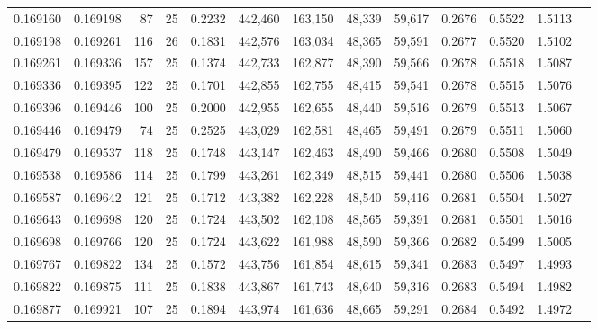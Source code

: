 \begin{tabular}{rrrrrrrrrrrrr}
0.169160 & 0.169198 &    87 &  25 &                                     0.2232 & 442,460 & 163,150 &  48,339 &  59,617 & 0.2676 & 0.5522 & 1.5113 \\
0.169198 & 0.169261 &   116 &  26 &                                     0.1831 & 442,576 & 163,034 &  48,365 &  59,591 & 0.2677 & 0.5520 & 1.5102 \\
0.169261 & 0.169336 &   157 &  25 &                                     0.1374 & 442,733 & 162,877 &  48,390 &  59,566 & 0.2678 & 0.5518 & 1.5087 \\
0.169336 & 0.169395 &   122 &  25 &                                     0.1701 & 442,855 & 162,755 &  48,415 &  59,541 & 0.2678 & 0.5515 & 1.5076 \\
0.169396 & 0.169446 &   100 &  25 &                                     0.2000 & 442,955 & 162,655 &  48,440 &  59,516 & 0.2679 & 0.5513 & 1.5067 \\
0.169446 & 0.169479 &    74 &  25 &                                     0.2525 & 443,029 & 162,581 &  48,465 &  59,491 & 0.2679 & 0.5511 & 1.5060 \\
0.169479 & 0.169537 &   118 &  25 &                                     0.1748 & 443,147 & 162,463 &  48,490 &  59,466 & 0.2680 & 0.5508 & 1.5049 \\
0.169538 & 0.169586 &   114 &  25 &                                     0.1799 & 443,261 & 162,349 &  48,515 &  59,441 & 0.2680 & 0.5506 & 1.5038 \\
0.169587 & 0.169642 &   121 &  25 &                                     0.1712 & 443,382 & 162,228 &  48,540 &  59,416 & 0.2681 & 0.5504 & 1.5027 \\
0.169643 & 0.169698 &   120 &  25 &                                     0.1724 & 443,502 & 162,108 &  48,565 &  59,391 & 0.2681 & 0.5501 & 1.5016 \\
0.169698 & 0.169766 &   120 &  25 &                                     0.1724 & 443,622 & 161,988 &  48,590 &  59,366 & 0.2682 & 0.5499 & 1.5005 \\
0.169767 & 0.169822 &   134 &  25 &                                     0.1572 & 443,756 & 161,854 &  48,615 &  59,341 & 0.2683 & 0.5497 & 1.4993 \\
0.169822 & 0.169875 &   111 &  25 &                                     0.1838 & 443,867 & 161,743 &  48,640 &  59,316 & 0.2683 & 0.5494 & 1.4982 \\
0.169877 & 0.169921 &   107 &  25 &                                     0.1894 & 443,974 & 161,636 &  48,665 &  59,291 & 0.2684 & 0.5492 & 1.4972 \\

\end{tabular}
